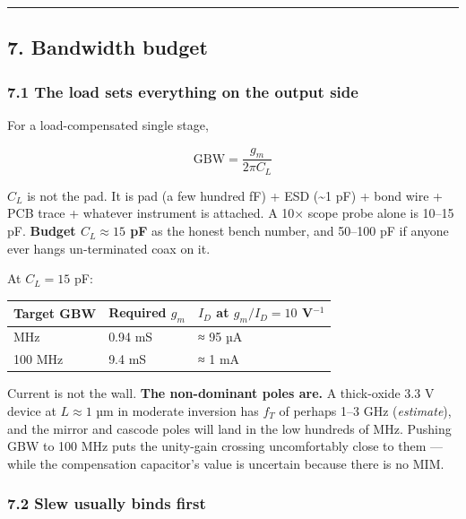 \documentclass[
  10pt,
  a4paper,
]{article}
\begin{document}
\begin{center}\rule{0.5\linewidth}{0.5pt}\end{center}

\hypertarget{bandwidth-budget}{%
\subsection{7. Bandwidth budget}\label{bandwidth-budget}}

\hypertarget{the-load-sets-everything-on-the-output-side}{%
\subsubsection{7.1 The load sets everything on the output
side}\label{the-load-sets-everything-on-the-output-side}}

For a load-compensated single stage,

\[\mathrm{GBW} = \frac{g_m}{2\pi C_L}\]

\(C_L\) is not the pad. It is pad (a few hundred fF) + ESD
(\textasciitilde1 pF) + bond wire + PCB trace + whatever instrument is
attached. A 10× scope probe alone is 10--15 pF. \textbf{Budget
\(C_L \approx 15\) pF} as the honest bench number, and 50--100 pF if
anyone ever hangs un-terminated coax on it.

At \(C_L = 15\) pF:

\begin{longtable}[]{@{}lll@{}}
\toprule\noalign{}
Target GBW & Required \(g_m\) & \(I_D\) at \(g_m/I_D = 10\)
V\(^{-1}\) \\
\midrule\noalign{}
\endhead
\bottomrule\noalign{}
\endlastfoot
10 MHz & 0.94 mS & ≈ 95 µA \\
100 MHz & 9.4 mS & ≈ 1 mA \\
\end{longtable}

Current is not the wall. \textbf{The non-dominant poles are.} A
thick-oxide 3.3 V device at \(L \approx 1\) µm in moderate inversion has
\(f_T\) of perhaps 1--3 GHz (\emph{estimate}), and the mirror and
cascode poles will land in the low hundreds of MHz. Pushing GBW to 100
MHz puts the unity-gain crossing uncomfortably close to them --- while
the compensation capacitor's value is uncertain because there is no MIM.

\hypertarget{slew-usually-binds-first}{%
\subsubsection{7.2 Slew usually binds
first}\label{slew-usually-binds-first}}
\end{document}
